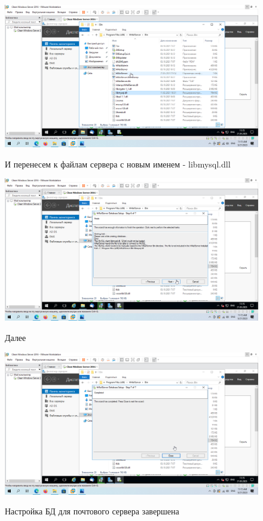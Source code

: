 \documentclass[a4paper]{article}
\begin{document}
  \begin{figure}[H]
    \centering
    \includegraphics[width=\textwidth]{11_0064}
    \label{img:64}
    \caption{И перенесем к файлам сервера с новым именем - libmysql.dll}
  \end{figure}

  \begin{figure}[H]
    \centering
    \includegraphics[width=\textwidth]{11_0065}
    \label{img:65}
    \caption{Далее}
  \end{figure}

  \begin{figure}[H]
    \centering
    \includegraphics[width=\textwidth]{11_0066}
    \label{img:66}
    \caption{Настройка БД для почтового сервера завершена}
  \end{figure}
\end{document}
